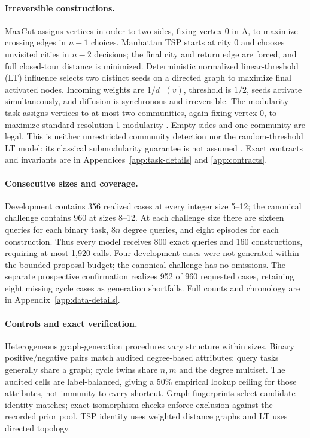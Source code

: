 \paragraph{Irreversible constructions.}
MaxCut assigns vertices in order to two sides, fixing vertex 0 in A,
to maximize crossing edges in $n-1$ choices. Manhattan TSP starts at city 0
and chooses unvisited cities in $n-2$ decisions; the final city and return
edge are forced, and full closed-tour distance is minimized.
Deterministic normalized linear-threshold (LT) influence selects two
distinct seeds on a directed graph to maximize final activated nodes.
Incoming weights are $1/d^-(v)$, threshold is $1/2$, seeds activate
simultaneously, and diffusion is synchronous and irreversible.
The modularity task assigns vertices to at most two communities, again
fixing vertex 0, to maximize standard resolution-1 modularity
\cite{newman2004community}. Empty sides and one community are legal.
This is neither unrestricted community detection nor the random-threshold
LT model: its classical submodularity guarantee is not assumed
\cite{kempe2015influence}. Exact contracts and invariants are in
Appendices~\ref{app:task-details} and \ref{app:contracts}.

\paragraph{Consecutive sizes and coverage.}
Development contains 356 realized cases at every integer size 5--12;
the canonical challenge contains 960 at sizes 8--12. At each challenge
size there are sixteen queries for each binary task, $8n$ degree queries,
and eight episodes for each construction. Thus every model receives
800 exact queries and 160 constructions, requiring at most 1,920 calls.
Four development cases were not generated within the bounded proposal
budget; the canonical challenge has no omissions.
The separate prospective confirmation realizes 952 of 960 requested
cases, retaining eight missing cycle cases as generation shortfalls.
Full counts and chronology are in Appendix~\ref{app:data-details}.

\paragraph{Controls and exact verification.}
Heterogeneous graph-generation procedures vary structure within sizes.
Binary positive/negative pairs match audited degree-based attributes:
query tasks generally share a graph; cycle twins share $n,m$ and the degree
multiset. The audited cells are label-balanced, giving a 50\% empirical
lookup ceiling for those attributes, not immunity to every shortcut.
Graph fingerprints select candidate identity matches; exact isomorphism
checks enforce exclusion against the recorded prior pool. TSP identity uses
weighted distance graphs and LT uses directed topology.

